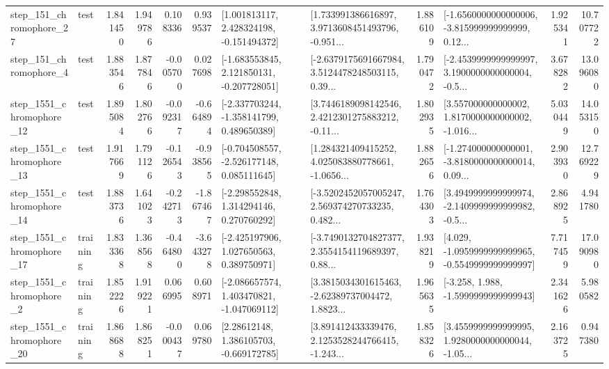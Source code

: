 \begin{tabular}{llrrrrllrlrr}
  step\_151\_chromophore\_27 &      test &      1.841450 &    1.949786 &      0.108336 &  0.939537 &    [1.001813117, 2.428324198, -0.151494372] &  [1.733991386616897, 3.9713608451493796, -0.951... &       1.886109 &  [-1.6560000000000006, -3.815999999999999, 0.12... &            1.925341 &         10.707722 \\
   step\_151\_chromophore\_4 &      test &      1.883546 &    1.877846 &     -0.005700 &  0.027698 &   [-1.683553845, 2.121850131, -0.207728051] &  [-2.6379175691667984, 3.5124478248503115, 0.39... &       1.790472 &  [-2.4539999999999997, 3.1900000000000004, -0.5... &            3.678282 &         13.096080 \\
 step\_1551\_chromophore\_12 &      test &      1.895084 &    1.802766 &     -0.092317 & -0.664894 &   [-2.337703244, -1.358141799, 0.489650389] &  [3.7446189098142546, 2.4212301275883212, -0.11... &       1.802935 &  [3.557000000000002, 1.8170000000000002, -1.016... &            5.030449 &         14.053150 \\
 step\_1551\_chromophore\_13 &      test &      1.917669 &    1.791126 &     -0.126543 & -0.938565 &   [-0.704508557, -2.526177148, 0.085111645] &  [1.284321409415252, 4.025083880778661, -1.0656... &       1.882656 &  [-1.274000000000001, -3.8180000000000014, 0.09... &            2.903930 &         12.769229 \\
 step\_1551\_chromophore\_14 &      test &      1.883736 &    1.641023 &     -0.242713 & -1.867467 &    [-2.298552848, 1.314294146, 0.270760292] &  [-3.5202452057005247, 2.569374270733235, 0.482... &       1.764303 &  [3.4949999999999974, -2.1409999999999982, -0.5... &            2.868925 &          4.941780 \\
 step\_1551\_chromophore\_17 &  training &      1.833368 &    1.368568 &     -0.464800 & -3.643278 &    [-2.425197906, 1.027650563, 0.389750971] &  [-3.7490132704827377, 2.3554154119689397, 0.88... &       1.938219 &  [4.029, -1.0959999999999965, -0.5549999999999997] &            7.717459 &         17.090980 \\
  step\_1551\_chromophore\_2 &  training &      1.852226 &    1.919221 &      0.066995 &  0.608971 &   [-2.086657574, 1.403470821, -1.047069112] &  [3.3815034301615463, -2.62389737004472, 1.8823... &       1.965635 &               [-3.258, 1.988, -1.5999999999999943] &            2.341626 &          5.980582 \\
 step\_1551\_chromophore\_20 &  training &      1.868688 &    1.868251 &     -0.000437 &  0.069780 &     [2.28612148, 1.386105703, -0.669172785] &  [3.891412433339476, 2.1253528244766415, -1.243... &       1.858326 &  [3.4559999999999995, 1.9280000000000044, -1.05... &            2.163725 &          0.947380 \\

\end{tabular}
